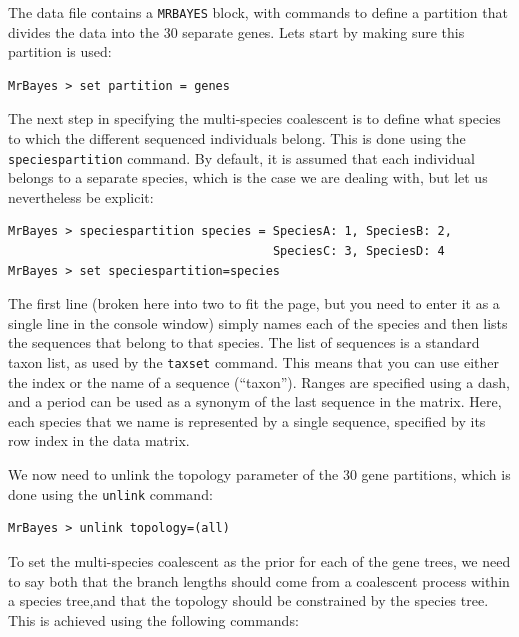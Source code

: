 \documentclass[12pt]{book}
\newcommand{\ttt}[1]{\texttt{#1}}
\begin{document}
The data file contains a \ttt{MRBAYES} block, with commands to define a partition that divides the
data into the 30 separate genes. Lets start by making sure this partition is used:

\begin{singlespacing}
\small
\begin{verbatim}
MrBayes > set partition = genes
\end{verbatim}
\end{singlespacing}
\normalsize

The next step in specifying the multi-species coalescent is to define what species to which the
different sequenced individuals belong. This is done using the \ttt{speciespartition} command. By
default, it is assumed that each individual belongs to a separate species, which is the case we are
dealing with, but let us nevertheless be explicit:

\begin{singlespacing}
\small
\begin{verbatim}
MrBayes > speciespartition species = SpeciesA: 1, SpeciesB: 2,
                                     SpeciesC: 3, SpeciesD: 4
MrBayes > set speciespartition=species
\end{verbatim}
\end{singlespacing}
\normalsize

The first line (broken here into two to fit the page, but you need to enter it as a single line in
the console window) simply names each of the species and then lists the sequences that belong to
that species. The list of sequences is a standard taxon list, as used by the \ttt{taxset} command.
This means that you can use either the index or the name of a sequence (``taxon''). Ranges are
specified using a dash, and a period can be used as a synonym of the last sequence in the matrix.
Here, each species that we name is represented by a single sequence, specified by its row index in
the data matrix.

We now need to unlink the topology parameter of the 30 gene partitions, which is done using the
\ttt{unlink} command:

\begin{singlespacing}
\small
\begin{verbatim}
MrBayes > unlink topology=(all)
\end{verbatim}
\end{singlespacing}
\normalsize

To set the multi-species coalescent as the prior for each of the gene trees, we need to say both
that the branch lengths should come from a coalescent process within a species tree,and that the
topology should be constrained by the species tree. This is achieved using the following commands:
\end{document}
